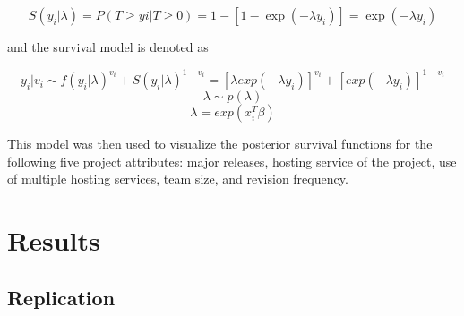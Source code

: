 \documentclass[acmconf]{acmart}
\begin{document}
\begin{equation}
S(y_i|\lambda) = P(T \geq yi|T \geq 0) = 1 - [1 - \exp(-  \lambda y_i)] = \exp(- \lambda y_i)
\end{equation}

and the survival model is denoted as

\begin{equation}
y_i|v_i \sim f(y_i| \lambda)^{v_i} + S(y_i| \lambda)^{1-v_i} = [\lambda exp(-  \lambda y_i)]^{v_i} + [exp(-  \lambda y_i)]^{1-v_i}
\end{equation}
\begin{equation}
\lambda \sim p(\lambda)
\end{equation}
\begin{equation}
\lambda = exp(x_i^T \beta)
\end{equation}

This model was then used to visualize the posterior survival functions for the following five project attributes: major releases, hosting service of the project, use of multiple hosting services, team size, and revision frequency. 

\section{Results} \label{results}

\subsection{Replication}
\end{document}

